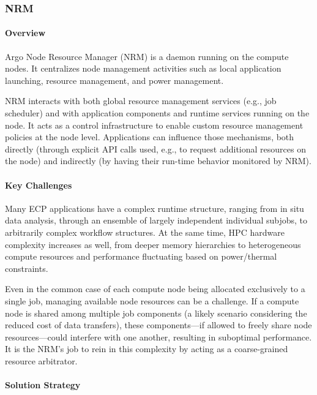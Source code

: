 \subsubsection*{NRM}

\paragraph{Overview}

Argo Node Resource Manager (NRM) is a daemon running on the compute
nodes. It centralizes node management activities such as local application
launching, resource management, and power management.

NRM interacts with both global resource management services (e.g., job
scheduler) and with application components and runtime services running on
the node. It acts as a control infrastructure to enable custom resource
management policies at the node level.  Applications can influence those
mechanisms, both directly (through explicit API calls used, e.g., to
request additional resources on the node) and indirectly (by having their
run-time behavior monitored by NRM).

\paragraph{Key Challenges}

Many ECP applications have a complex runtime structure, ranging from in
situ data analysis, through an ensemble of largely independent individual
subjobs, to arbitrarily complex workflow structures.  At the same time, HPC
hardware complexity increases as well, from deeper memory hierarchies to
heterogeneous compute resources and performance fluctuating based on
power/thermal constraints.

Even in the common case of each compute node being allocated exclusively to
a single job, managing available node resources can be a challenge.  If a
compute node is shared among multiple job components (a likely scenario
considering the reduced cost of data transfers), these components---if
allowed to freely share node resources---could interfere with one another,
resulting in suboptimal performance.  It is the NRM's job to rein in this
complexity by acting as a coarse-grained resource arbitrator.

\paragraph{Solution Strategy}

